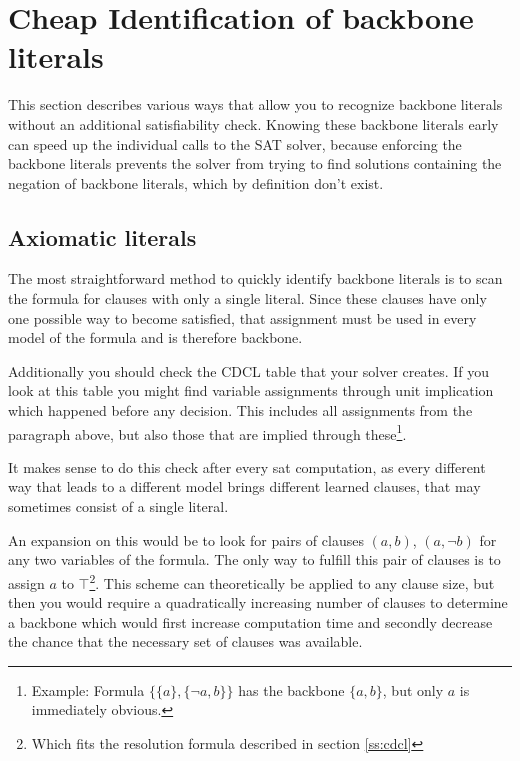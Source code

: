 \section{Cheap Identification of backbone literals}
This section describes various ways that allow you to recognize backbone literals without an additional satisfiability check. Knowing these backbone literals early can speed up the individual calls to the SAT solver, because enforcing the backbone literals prevents the solver from trying to find solutions containing the negation of backbone literals, which by definition don't exist.



\subsection{Axiomatic literals}
\label{subsec:axiomatic}
The most straightforward method to quickly identify backbone literals is to scan the formula for clauses with only a single literal. Since these clauses have only one possible way to become satisfied, that assignment must be used in every model of the formula and is therefore backbone.

Additionally you should check the CDCL table that your solver creates. If you look at this table you might find variable assignments through unit implication which happened before any decision. This includes all assignments from the paragraph above, but also those that are implied through these\footnote{Example: Formula $\{\{a\},\{\neg a, b\}\}$ has the backbone $\{a,b\}$, but only $a$ is immediately obvious.}.

It makes sense to do this check after every sat computation, as every different way that leads to a different model brings different learned clauses, that may sometimes consist of a single literal.

An expansion on this would be to look for pairs of clauses $(a,b)$, $(a,\neg b)$ for any two variables of the formula. The only way to fulfill this pair of clauses is to assign $a$ to $\top$\footnote{Which fits the resolution formula described in 
section \ref{ss:cdcl}}. This scheme can theoretically be applied to any clause size, but then you would require a quadratically increasing number of clauses to determine a backbone which would first increase computation time and secondly decrease the chance that the necessary set of clauses was available.

